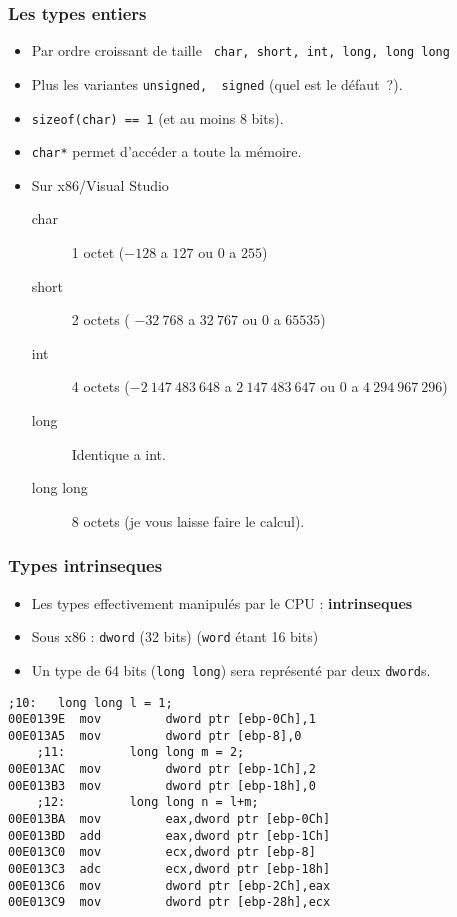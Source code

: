 \documentclass{beamer}
\begin{document}
\begin{frame}
\frametitle{Les types entiers}
\begin{itemize}
\item Par ordre croissant de taille \lstinline+ char, short, int, long, long long+
\item Plus les variantes \lstinline+unsigned,  signed+ (quel est le défaut~?).
\item \lstinline+sizeof(char) == 1+ (et au moins 8 bits).
\item \lstinline+char*+ permet d'accéder a toute la mémoire.
\pause
\item Sur x86/Visual Studio 
\begin{description}
  \item[char] 1 octet ($-128$ a $127$ ou $0$ a $255$)
  \item[short] 2 octets ( $-32~768$ a $32~767$ ou $0$ a $65535$)
  \item[int] 4 octets ($-2~147~483~ 648$ a $2~147~483~ 647$ ou $0$ a $4~294~967~296$)
  \item[long] Identique a int.
  \item[long long] 8 octets (je vous laisse faire le calcul).
\end{description}

\end{itemize}
\end{frame}

\begin{frame}[fragile]
\frametitle{Types intrinseques}

\begin{itemize}
\item Les types effectivement manipulés par le CPU : \textbf{intrinseques}
\item Sous x86 : \lstinline[language={[x86masm]Assembler}]+dword+ (32 bits) (\lstinline+word+ étant 16 bits)
\item Un type de 64 bits (\lstinline+long long+) sera représenté par deux \lstinline[language={[x86masm]Assembler}]+dword+s.
\end{itemize}

\begin{lstlisting}[language={[x86masm]Assembler}]
    ;10:   long long l = 1;
00E0139E  mov         dword ptr [ebp-0Ch],1  
00E013A5  mov         dword ptr [ebp-8],0  
    ;11:         long long m = 2;
00E013AC  mov         dword ptr [ebp-1Ch],2  
00E013B3  mov         dword ptr [ebp-18h],0  
    ;12:         long long n = l+m;
00E013BA  mov         eax,dword ptr [ebp-0Ch]  
00E013BD  add         eax,dword ptr [ebp-1Ch]  
00E013C0  mov         ecx,dword ptr [ebp-8]  
00E013C3  adc         ecx,dword ptr [ebp-18h]  
00E013C6  mov         dword ptr [ebp-2Ch],eax  
00E013C9  mov         dword ptr [ebp-28h],ecx 
\end{lstlisting}

\end{frame}
\end{document}
